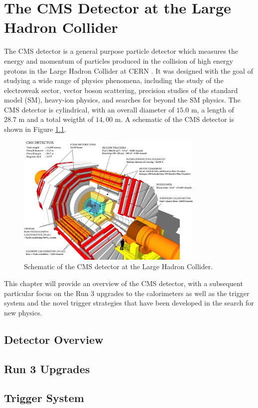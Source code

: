 \chapter{The CMS Detector at the Large Hadron Collider}

The CMS detector is a general purpose particle detector which measures the energy and momentum of particles produced in the collision of high energy protons in the Large Hadron Collider at CERN \cite{collaborationCMSExperimentCERN2008}. It was designed with the goal of studying a wide range of physics phenomena, including the study of the electroweak sector, vector boson scattering, precision studies of the standard model (SM), heavy-ion physics, and searches for beyond the SM physics. The CMS detector is cylindrical, with an overall diameter of $15.0 \text{ m}$, a length of $28.7 \text{ m}$ and a total weigtht of $14,00\text{ m}$. A schematic of the CMS detector is shown in Figure \ref{fig:cms_detector}.

\begin{figure}[ht]
	\centering
	\includegraphics[width=0.8\textwidth]{images/cms_detector.png}
	\caption{Schematic of the CMS detector at the Large Hadron Collider.}
	\label{fig:cms_detector}
\end{figure}

This chapter will provide an overview of the CMS detector, with a subsequent particular focus on the Run 3 upgrades to the calorimeters as well as the trigger system and the novel trigger strategies that have been developed in the search for new physics.

\section{Detector Overview}

\section{Run 3 Upgrades}

\section{Trigger System}
